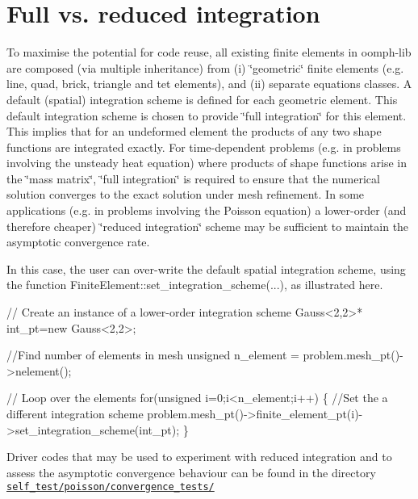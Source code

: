 \hypertarget{index_full_integration}{}\section{Full vs. reduced integration}\label{index_full_integration}
To maximise the potential for code reuse, all existing finite elements in {\ttfamily oomph-\/lib} are composed (via multiple inheritance) from (i) \char`\"{}geometric\char`\"{} finite elements (e.\-g. line, quad, brick, triangle and tet elements), and (ii) separate equations classes. A default (spatial) integration scheme is defined for each geometric element. This default integration scheme is chosen to provide \char`\"{}full integration\char`\"{} for this element. This implies that for an undeformed element the products of any two shape functions are integrated exactly. For time-\/dependent problems (e.\-g. in problems involving the unsteady heat equation) where products of shape functions arise in the \char`\"{}mass matrix\char`\"{}, \char`\"{}full integration\char`\"{} is required to ensure that the numerical solution converges to the exact solution under mesh refinement. In some applications (e.\-g. in problems involving the Poisson equation) a lower-\/order (and therefore cheaper) \char`\"{}reduced integration\char`\"{} scheme may be sufficient to maintain the asymptotic convergence rate.

In this case, the user can over-\/write the default spatial integration scheme, using the function {\ttfamily Finite\-Element\-::set\-\_\-integration\-\_\-scheme}(...), as illustrated here. 
\begin{DoxyCode}
 \textcolor{comment}{// Create an instance of a lower-order integration scheme}
 Gauss<2,2>* int\_pt=\textcolor{keyword}{new} Gauss<2,2>;

\textcolor{comment}{//Find number of elements in mesh}
\textcolor{keywordtype}{unsigned} n\_element = problem.mesh\_pt()->nelement();

\textcolor{comment}{// Loop over the elements }
\textcolor{keywordflow}{for}(\textcolor{keywordtype}{unsigned} i=0;i<n\_element;i++)
 \{
  \textcolor{comment}{//Set the a different integration scheme}
  problem.mesh\_pt()->finite\_element\_pt(i)->set\_integration\_scheme(int\_pt); 
 \}
\end{DoxyCode}


Driver codes that may be used to experiment with reduced integration and to assess the asymptotic convergence behaviour can be found in the directory \href{../../../self_test/poisson/convergence_tests}{\tt self\-\_\-test/poisson/convergence\-\_\-tests/} 

